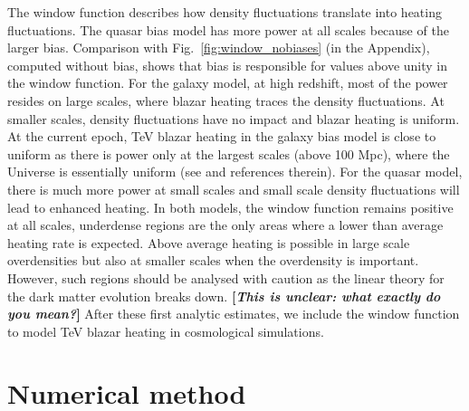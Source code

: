 \documentclass[twocolumns]{emulateapj}
\newcommand\Cc[1]{{\color{blue} \bf #1}} %
\begin{document}
The window function describes how density fluctuations translate into heating fluctuations. The quasar bias model has more power at all scales because of the larger bias. Comparison with Fig.~\ref{fig:window_nobiases} (in the Appendix), computed without bias, shows that bias is responsible for values above unity in the window function. For the galaxy model, at high redshift, most of the power resides on large scales, where blazar heating traces the density fluctuations. At smaller scales, density fluctuations have no impact and blazar heating is uniform. At the current epoch, TeV blazar heating in the galaxy bias model is close to uniform as there is power only at the largest scales (above 100 Mpc), where the Universe is essentially uniform (see \citet{2013MNRAS.429.2910C} and references therein). For the quasar model, there is much more power at small scales and small scale density fluctuations will lead to enhanced heating. In both models, the window function remains positive at all scales, underdense regions are the only areas where a lower than average heating rate is expected. Above average heating is possible in large scale overdensities but also at smaller scales when the overdensity is important. However, such regions should be analysed with caution as the linear theory for the dark matter evolution breaks down. \Cc{[{\em This is unclear: what exactly do you mean?}]} After these first analytic estimates, we include the window function to model TeV blazar heating in cosmological simulations.
\section{Numerical method}
\end{document}
